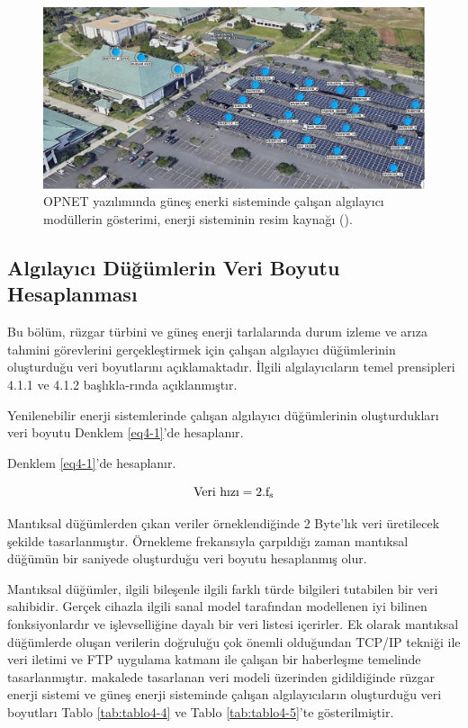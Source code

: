 \begin{figure}[htbp]
\centerline{\includegraphics[width=\columnwidth]{Resim/sekil4-3.jpg}}
\caption{OPNET yazılımında güneş enerki sisteminde çalışan algılayıcı modüllerin gösterimi, enerji sisteminin resim kaynağı (\protect{}).}
\label{fig:4-3}
\end{figure}


\subsection{Algılayıcı Düğümlerin Veri Boyutu Hesaplanması}\label{verboyut}

Bu bölüm, rüzgar türbini ve güneş enerji tarlalarında durum izleme ve arıza tahmini görevlerini gerçekleştirmek için çalışan algılayıcı düğümlerinin oluşturduğu veri boyutlarını açıklamaktadır. İlgili algılayıcıların temel prensipleri 4.1.1 ve 4.1.2 başlıkla-rında açıklanmıştır.


Yenilenebilir enerji sistemlerinde çalışan algılayıcı düğümlerinin oluşturdukları veri boyutu Denklem \eqref{eq4-1}'de hesaplanır\cite{ahmed2011simulation}.


Denklem \eqref{eq4-1}'de hesaplanır. 

\begin{equation}
\text{Veri hızı} = 2.\text{f\textsubscript{s}} \label{eq4-1}
\end{equation}

Mantıksal düğümlerden çıkan veriler örneklendiğinde 2 Byte’lık veri üretilecek şekilde tasarlanmıştır. Örnekleme frekansıyla çarpıldığı zaman mantıksal düğümün bir saniyede oluşturduğu veri boyutu hesaplanmış olur.

Mantıksal düğümler, ilgili bileşenle ilgili farklı türde bilgileri tutabilen bir veri sahibidir. Gerçek cihazla ilgili sanal model tarafından modellenen iyi bilinen fonksiyonlardır ve işlevselliğine dayalı bir veri listesi içerirler. Ek olarak mantıksal düğümlerde oluşan verilerin doğruluğu çok önemli olduğundan TCP/IP tekniği ile veri iletimi ve FTP uygulama katmanı ile çalışan bir haberleşme temelinde tasarlanmıştır. \cite{klise2017application} makalede tasarlanan veri modeli üzerinden gidildiğinde rüzgar enerji sistemi ve güneş enerji sisteminde çalışan algılayıcıların oluşturduğu veri boyutları Tablo \ref{tab:tablo4-4} ve Tablo \ref{tab:tablo4-5}’te gösterilmiştir.

